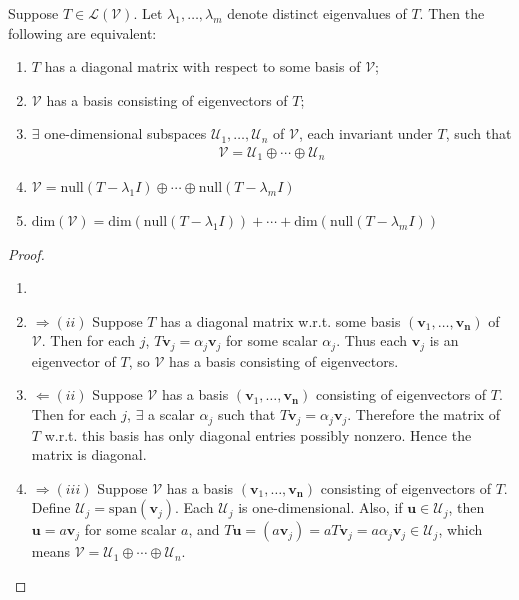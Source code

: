 \begin{proposition} Suppose $T \in \mathcal{L}(\mathcal{V})$. Let $\lambda_1, \ldots, \lambda_m$ denote distinct eigenvalues of $T$. Then the following are equivalent:
\begin{enumerate}[label=\roman*.]
\setlength{\itemsep}{0pt}
\item $T$ has a diagonal matrix with respect to some basis of $\mathcal{V}$;
\item $\mathcal{V}$ has a basis consisting of eigenvectors of $T$;
\item $\exists$ one-dimensional subspaces $\mathcal{U}_1, \ldots, \mathcal{U}_n$ of $\mathcal{V}$, each invariant under $T$, such that
\begin{align}
\mathcal{V} = \mathcal{U}_1 \oplus \cdots \oplus \mathcal{U}_n \nonumber
\end{align}
\item $\mathcal{V} = \text{null}(T - \lambda_1 I) \oplus \cdots \oplus \text{null}(T - \lambda_m I)$
\item $\text{dim}(\mathcal{V}) = \text{dim}(\text{null}(T - \lambda_1 I)) + \cdots + \text{dim}(\text{null}(T - \lambda_m I))$
\end{enumerate}
\begin{proof} 
\begin{enumerate}[label=\roman*.]
\setlength{\itemsep}{0pt}
\item[]
\item[$(i)$]$\Rightarrow (ii)$ Suppose $T$ has a diagonal matrix w.r.t. some basis $(\mathbf{v}_1, \ldots, \mathbf{v_n})$ of $\mathcal{V}$. Then for each $j$, $T \mathbf{v}_j = \alpha_j \mathbf{v}_j$ for some scalar $\alpha_j$. Thus each $\mathbf{v}_j$ is an eigenvector of $T$, so $\mathcal{V}$ has a basis consisting of eigenvectors.
\item[$(i)$]$\Leftarrow (ii)$ Suppose $\mathcal{V}$ has a basis $(\mathbf{v}_1, \ldots, \mathbf{v_n})$ consisting of eigenvectors of $T$. Then for each $j$, $\exists$ a scalar $\alpha_j$ such that $T \mathbf{v}_j = \alpha_j \mathbf{v}_j$. Therefore the matrix of $T$ w.r.t. this basis has only diagonal entries possibly nonzero. Hence the matrix is diagonal.
\item[$(ii)$]$\Rightarrow (iii)$ Suppose $\mathcal{V}$ has a basis $(\mathbf{v}_1, \ldots, \mathbf{v_n})$ consisting of eigenvectors of $T$. Define $\mathcal{U}_j = \text{span}(\mathbf{v}_j)$. Each $\mathcal{U}_j$ is one-dimensional. Also, if $\mathbf{u} \in \mathcal{U}_j$, then $\mathbf{u} = a \mathbf{v}_j$ for some scalar $a$, and $T \mathbf{u} = (a \mathbf{v}_j) = a T \mathbf{v}_j = a \alpha_j \mathbf{v}_j \in \mathcal{U}_j$, which means $\mathcal{V} = \mathcal{U}_1 \oplus \cdots \oplus \mathcal{U}_n$.

\end{enumerate}
\end{proof}
\end{proposition}
